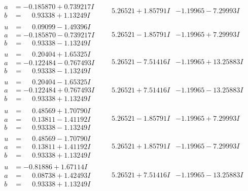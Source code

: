 \documentclass[1p]{elsarticle_modified}
\theoremstyle{definition}
\begin{document}
$$\begin{array}{c|c|c}
\begin{aligned}
a &= -0.185870 + 0.739217 I \\
b &= \phantom{-}0.93338 + 1.13249 I\end{aligned}
 & \phantom{-}5.26521 + 1.85791 I & -1.19965 - 7.29993 I \\ \hline\begin{aligned}
u &= \phantom{-}0.09099 - 1.49396 I \\
a &= -0.185870 - 0.739217 I \\
b &= \phantom{-}0.93338 - 1.13249 I\end{aligned}
 & \phantom{-}5.26521 - 1.85791 I & -1.19965 + 7.29993 I \\ \hline\begin{aligned}
u &= \phantom{-}0.20404 + 1.65325 I \\
a &= -0.122484 - 0.767493 I \\
b &= \phantom{-}0.93338 - 1.13249 I\end{aligned}
 & \phantom{-}5.26521 - 7.51416 I & -1.19965 + 13.25883 I \\ \hline\begin{aligned}
u &= \phantom{-}0.20404 - 1.65325 I \\
a &= -0.122484 + 0.767493 I \\
b &= \phantom{-}0.93338 + 1.13249 I\end{aligned}
 & \phantom{-}5.26521 + 7.51416 I & -1.19965 - 13.25883 I \\ \hline\begin{aligned}
u &= \phantom{-}0.48569 + 1.70790 I \\
a &= \phantom{-}0.13811 - 1.41192 I \\
b &= \phantom{-}0.93338 - 1.13249 I\end{aligned}
 & \phantom{-}5.26521 - 1.85791 I & -1.19965 + 7.29993 I \\ \hline\begin{aligned}
u &= \phantom{-}0.48569 - 1.70790 I \\
a &= \phantom{-}0.13811 + 1.41192 I \\
b &= \phantom{-}0.93338 + 1.13249 I\end{aligned}
 & \phantom{-}5.26521 + 1.85791 I & -1.19965 - 7.29993 I \\ \hline\begin{aligned}
u &= -0.81886 + 1.67114 I \\
a &= \phantom{-}0.08738 + 1.42493 I \\
b &= \phantom{-}0.93338 + 1.13249 I\end{aligned}
 & \phantom{-}5.26521 + 7.51416 I & -1.19965 - 13.25883 I \\ \hline\begin{aligned}

\end{aligned}
\end{array}$$
\end{document}
